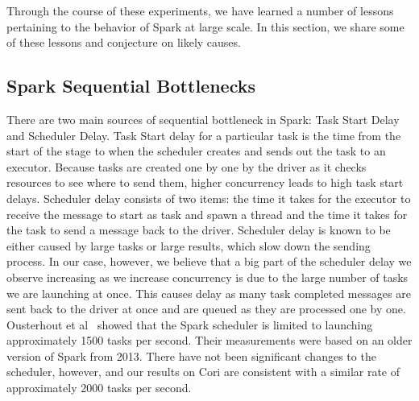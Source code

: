 Through the course of these experiments, we have learned a number of lessons pertaining to the behavior of Spark at large scale. In this section, we share some of these lessons and conjecture on likely causes.
\subsection{Spark Sequential Bottlenecks}

\begin{table}[th]
\begin{center}
\end{center}
\caption{Spark scheduling delays}
\label{tab:scheduling}
\end{table}
There are two main sources of sequential bottleneck in Spark: Task Start Delay and Scheduler Delay. Task Start delay for a particular task is the time from the start of the stage to when the scheduler creates and sends out the task to an executor. Because tasks are created one by one by the driver as it checks resources to see where to send them, higher concurrency leads to high task start delays. Scheduler delay consists of two items: the time it takes for the executor to receive the message to start as task and spawn a thread and the time it takes for the task to send a message back to the driver. Scheduler delay is known to be either caused by large tasks or large results, which slow down the sending process. In our case, however, we believe that a big part of the scheduler delay we observe increasing as we increase concurrency is due to the large number of tasks we are launching at once. This causes delay as many task completed messages are sent back to the driver at once and are queued as they are processed one by one. Ousterhout et al~\cite{Ousterhout13Sparrow} showed that the Spark scheduler is limited to launching approximately 1500 tasks per second.  Their measurements were based on an older version of Spark from 2013.  There have not been significant changes to the scheduler, however, and our results on Cori are consistent with a similar rate of approximately 2000 tasks per second.  
